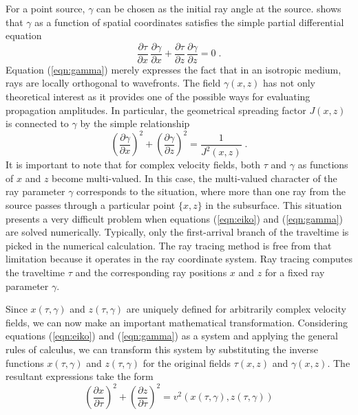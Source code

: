 For a point source, $\gamma$ can be chosen as the initial ray angle at
the source.  \cite{Zhang.sepphd.76} shows that $\gamma$ as a
function of spatial coordinates satisfies the simple partial
differential equation
\begin{equation}
  {\frac{\partial \tau}{\partial x}\,\frac{\partial \gamma}{\partial x}}  +
  {\frac{\partial \tau}{\partial z}\,\frac{\partial \gamma}{\partial z}} = 0\;.
  \label{eqn:gamma}
\end{equation}
Equation (\ref{eqn:gamma}) merely expresses the fact that in an
isotropic medium, rays are locally orthogonal to wavefronts. The field
$\gamma (x,z)$ has not only theoretical interest as it provides one of
the possible ways for evaluating propagation amplitudes. In particular,
the geometrical spreading factor $J (x,z)$ is connected to $\gamma$ by
the simple relationship \cite[]{Zhang.sepphd.76}
\begin{equation}
  \label{eqn:spread}
  \left(\frac{\partial \gamma}{\partial x}\right)^2 +
  \left(\frac{\partial \gamma}{\partial z}\right)^2 =
  \frac{1}{J^2(x,z)}\;.
\end{equation}
It is important to note that for complex velocity fields, both $\tau$
and $\gamma$ as functions of $x$ and $z$ become multi-valued. In this
case, the multi-valued character of the ray parameter $\gamma$
corresponds to the situation, where more than one ray from the source
passes through a particular point $\{x,z\}$ in the subsurface. This
situation presents a very difficult problem when equations
(\ref{eqn:eiko}) and (\ref{eqn:gamma}) are solved numerically.
Typically, only the first-arrival branch of the traveltime is picked
in the numerical calculation. The ray tracing method is free from that
limitation because it operates in the ray coordinate system. Ray
tracing computes the traveltime $\tau$ and the corresponding ray
positions $x$ and $z$ for a fixed ray parameter $\gamma$.
\par
Since $x (\tau,\gamma)$ and $z (\tau, \gamma)$ are uniquely defined for
arbitrarily complex velocity fields, we can now make an important
mathematical transformation. Considering equations (\ref{eqn:eiko}) and
(\ref{eqn:gamma}) as a system and applying the general rules of calculus,
we can transform this system by substituting the inverse functions 
$x (\tau,\gamma)$ and $z (\tau, \gamma)$ for the original fields
$\tau (x,z)$ and $\gamma (x,z)$. The resultant expressions take the form
\begin{equation}
  \label{eqn:one}
  \left(\frac{\partial x}{\partial \tau}\right)^2 +
  \left(\frac{\partial z}{\partial \tau}\right)^2  =  
  v^2 \left(x(\tau,\gamma),z(\tau,\gamma)\right)
\end{equation}
